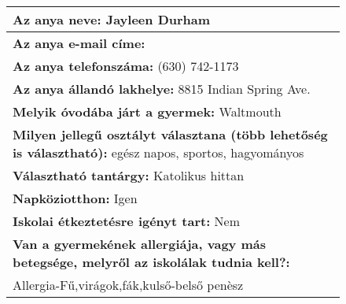 \documentclass[10pt,a4paper]{article}
\begin{document}
\begin{figure}[!ht]
\begin{tabular}{|m{\textwidth}|}
\hline\vspace{3pt}
\textbf{Az anya neve:} \hspace{0.5cm} Jayleen Durham \vspace{3pt} \\
\hline\vspace{3pt}
\textbf{Az anya e-mail címe:} \hspace{0.5cm}   \vspace{3pt} \\
\hline\vspace{3pt}
\textbf{Az anya telefonszáma:} \hspace{0.5cm} (630) 742-1173 \vspace{3pt} \\
\hline\vspace{3pt}
\textbf{Az anya állandó lakhelye:} \hspace{0.5cm} 8815 Indian Spring Ave. \vspace{3pt} \\
\hline\vspace{3pt}
\textbf{Melyik óvodába járt a gyermek:} \hspace{0.5cm} Waltmouth \vspace{3pt} \\
\hline\vspace{3pt}
\textbf{Milyen jellegű osztályt választana (több lehetőség is választható):} \hspace{0.5cm} egész napos, sportos, hagyományos \vspace{3pt} \\
\hline\vspace{3pt}
\textbf{Választható tantárgy:} \hspace{0.5cm} Katolikus hittan \vspace{3pt} \\
\hline\vspace{3pt}
\textbf{Napköziotthon:} \hspace{0.5cm} Igen \vspace{3pt} \\
\hline\vspace{3pt}
\textbf{Iskolai étkeztetésre igényt tart:} \hspace{0.5cm} Nem \vspace{3pt} \\
\hline\vspace{3pt}
\textbf{Van a gyermekének allergiája, vagy más betegsége, melyről az iskolálak tudnia kell?:} \\ \hspace{0.5cm} Allergia-Fű,virágok,fák,kulső-belső penèsz \vspace{3pt} \\

\end{tabular}
\end{figure}
\end{document}
